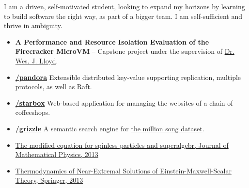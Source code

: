 

\begin{flushleft}
\justifying
I am a driven, self-motivated student, looking to expand my horizons by learning to build
software the right way, as part of a bigger team. I am self-sufficient and thrive in ambiguity.

\end{flushleft}


\small
{}


\begin{itemize}
    \item \justifying \textbf{A Performance and Resource Isolation Evaluation of the Firecracker MicroVM} -- Capstone project under the supervision of \href{http://faculty.washington.edu/wlloyd/}{Dr. Wes. J. Lloyd}.
    \item \justifying \href{https://github.com/zsadeghi/pandora}{\githubsymbol \textbf{/pandora}} Extensible distributed key-value supporting replication, multiple protocols, as well as Raft. 
    \item \justifying \href{https://github.com/zsadeghi/starbox}{\githubsymbol \textbf{/starbox}} Web-based application for managing the websites of a chain of coffeeshops.
    \item \justifying \href{https://github.com/zsadeghi/grizzle}{\githubsymbol \textbf{/grizzle}} A semantic search engine for \href{http://millionsongdataset.com/}{the million song dataset}.
\end{itemize}


\begin{itemize}
    \item \href{https://dx.doi.org/10.1063/1.4823715}{The modified equation for spinless particles and superalgebr, Journal of Mathematical Physics, 2013}
    \item \href{https://link.springer.com/article/10.1007/s10773-013-1542-2#page-1}{Thermodynamics of Near-Extremal Solutions of Einstein-Maxwell-Scalar Theory, Springer, 2013}
\end{itemize}







